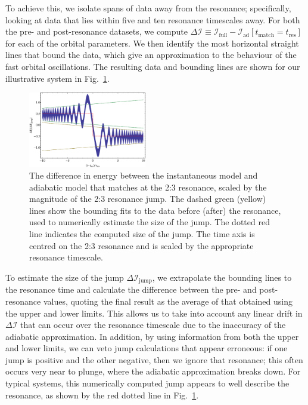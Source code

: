 \documentclass[aps,prd,amsfonts,amssymb,amsmath,nofootinbib,reprint,showpacs,superscriptaddress,twocolumn]{revtex4}
\newcommand{\figref}[1]{Fig.\ \ref{fig:#1}}
\begin{document}
To achieve this, we isolate spans of data away from the resonance; specifically, looking at data that lies within five and ten resonance timescales away. For both the pre- and post-resonance datasets, we compute $\Delta \mathcal{I} \equiv \mathcal{I}_{\mathrm{full}} - \mathcal{I}_\mathrm{ad}[t_{\mathrm{match}} = t_\mathrm{res}]$ for each of the orbital parameters. We then identify the most horizontal straight lines that bound the data, which give an approximation to the behaviour of the fast orbital oscillations. The resulting data and bounding lines are shown for our illustrative system in \figref{res-jump-calc}.

\begin{figure}[htbp]
\centering
\includegraphics[width=0.46\textwidth]{Fig_res_jump_calc}
\caption{\label{fig:res-jump-calc}The difference in energy between the instantaneous model and adiabatic model that matches at the 2:3 resonance, scaled by the magnitude of the 2:3 resonance jump. The dashed green (yellow) lines show the bounding fits to the data before (after) the resonance, used to numerically estimate the size of the jump. The dotted red line indicates the computed size of the jump. The time axis is centred on the 2:3 resonance and is scaled by the appropriate resonance timescale.}
\end{figure}

To estimate the size of the jump $\Delta \mathcal{I}_{\mathrm{jump}}$, we extrapolate the bounding lines to the resonance time and calculate the difference between the pre- and post-resonance values, quoting the final result as the average of that obtained using the upper and lower limits. This allows us to take into account any linear drift in $\Delta \mathcal{I}$ that can occur over the resonance timescale due to the inaccuracy of the adiabatic approximation. In addition, by using information from both the upper and lower limits, we can veto jump calculations that appear erroneous: if one jump is positive and the other negative, then we ignore that resonance; this often occurs very near to plunge, where the adiabatic approximation breaks down. For typical systems, this numerically computed jump appears to well describe the resonance, as shown by the red dotted line in \figref{res-jump-calc}.
\end{document}
